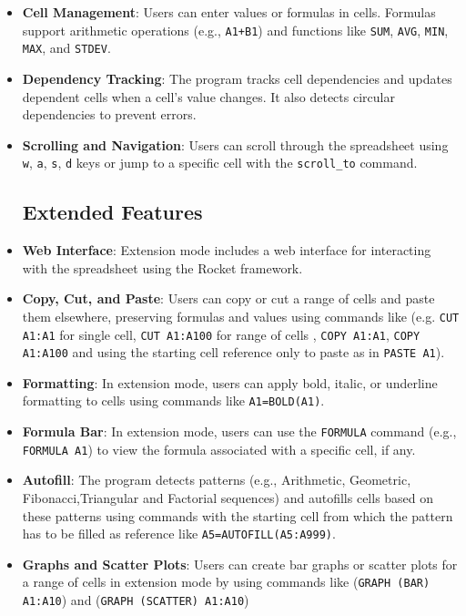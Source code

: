 \documentclass[12pt]{article}
\begin{document}
\begin{itemize}
    \item \textbf{Cell Management}: Users can enter values or formulas in cells. Formulas support arithmetic operations (e.g., \texttt{A1+B1}) and functions like \texttt{SUM}, \texttt{AVG}, \texttt{MIN}, \texttt{MAX}, and \texttt{STDEV}.
    \item \textbf{Dependency Tracking}: The program tracks cell dependencies and updates dependent cells when a cell’s value changes. It also detects circular dependencies to prevent errors.
    \item \textbf{Scrolling and Navigation}: Users can scroll through the spreadsheet using \texttt{w}, \texttt{a}, \texttt{s}, \texttt{d} keys or jump to a specific cell with the \texttt{scroll\_to} command.
\subsection{Extended Features}
     \item \textbf{Web Interface}: Extension mode includes a web interface for interacting with the spreadsheet using the Rocket framework.
    \item \textbf{Copy, Cut, and Paste}: Users can copy or cut a range of cells and paste them elsewhere, preserving formulas and values using commands like (e.g. \texttt{CUT A1:A1} for single cell, \texttt{CUT A1:A100} for range of cells , \texttt{COPY A1:A1}, \texttt{COPY A1:A100} and using the starting cell reference only to paste as in  \texttt{PASTE A1}).
    \item \textbf{Formatting}: In extension mode, users can apply bold, italic, or underline formatting to cells using commands like \texttt{A1=BOLD(A1)}.
    \item \textbf{Formula Bar}: In extension mode, users can use the \texttt{FORMULA} command (e.g., \texttt{FORMULA A1}) to view the formula associated with a specific cell, if any.
    \item \textbf{Autofill}: The program detects patterns (e.g., Arithmetic, Geometric, Fibonacci,Triangular and Factorial sequences) and autofills cells based on these patterns using commands with the starting cell from which the pattern has to be filled as reference like \texttt{A5=AUTOFILL(A5:A999)}.
    \item \textbf{Graphs and Scatter Plots}: Users can create bar graphs or scatter plots for a range of cells in extension mode by using commands like (\texttt{GRAPH (BAR) A1:A10}) and (\texttt{GRAPH (SCATTER) A1:A10})

\end{itemize}
\end{document}
